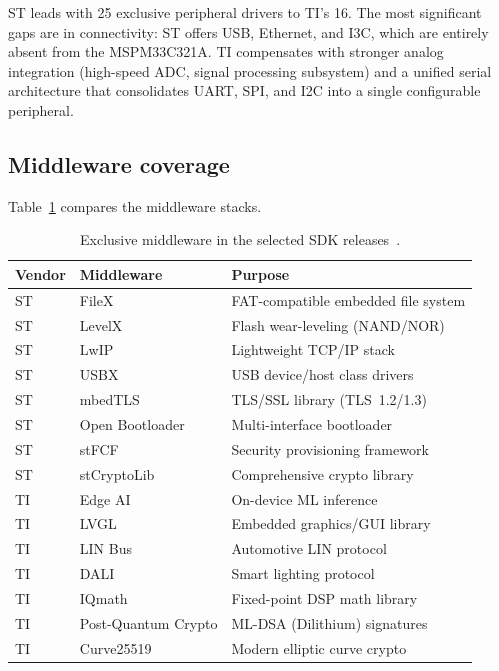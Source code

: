 ST leads with 25 exclusive peripheral drivers to TI's 16. The most significant gaps are
in connectivity: ST offers USB, Ethernet, and I3C, which are entirely absent from the
MSPM33C321A. TI compensates with stronger analog integration (high-speed ADC, signal
processing subsystem) and a unified serial architecture that consolidates UART, SPI, and
I2C into a single configurable peripheral.

\subsection{Middleware coverage}
\label{subsec:ti-mw-gaps}

Table~\ref{tab:ti-mw-exclusive} compares the middleware stacks.

\begin{table}[H]
\centering
\caption{Exclusive middleware in the selected SDK releases~\cite{stm32cubec5-sw,ti-mspm33-sdk}.}
\label{tab:ti-mw-exclusive}
\begin{tabular}{l l p{6cm}}
\toprule
\textbf{Vendor} & \textbf{Middleware} & \textbf{Purpose} \\
\midrule
ST & FileX              & FAT-compatible embedded file system \\
ST & LevelX             & Flash wear-leveling (NAND/NOR) \\
ST & LwIP               & Lightweight TCP/IP stack \\
ST & USBX               & USB device/host class drivers \\
ST & mbedTLS             & TLS/SSL library (TLS~1.2/1.3) \\
ST & Open Bootloader     & Multi-interface bootloader \\
ST & stFCF               & Security provisioning framework \\
ST & stCryptoLib          & Comprehensive crypto library \\
\midrule
TI & Edge AI             & On-device ML inference \\
TI & LVGL                & Embedded graphics/GUI library \\
TI & LIN Bus             & Automotive LIN protocol \\
TI & DALI                & Smart lighting protocol \\
TI & IQmath              & Fixed-point DSP math library \\
TI & Post-Quantum Crypto & ML-DSA (Dilithium) signatures \\
TI & Curve25519          & Modern elliptic curve crypto \\
\bottomrule
\end{tabular}
\end{table}

